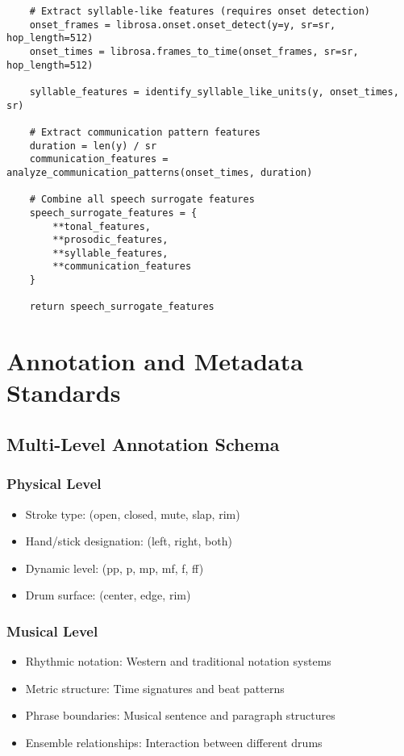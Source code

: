 \documentclass[12pt]{article}
\begin{document}
\begin{verbatim}
    # Extract syllable-like features (requires onset detection)
    onset_frames = librosa.onset.onset_detect(y=y, sr=sr, hop_length=512)
    onset_times = librosa.frames_to_time(onset_frames, sr=sr, hop_length=512)
    
    syllable_features = identify_syllable_like_units(y, onset_times, sr)
    
    # Extract communication pattern features
    duration = len(y) / sr
    communication_features = analyze_communication_patterns(onset_times, duration)
    
    # Combine all speech surrogate features
    speech_surrogate_features = {
        **tonal_features,
        **prosodic_features,
        **syllable_features,
        **communication_features
    }
    
    return speech_surrogate_features
\end{verbatim}

\section{Annotation and Metadata Standards}

\subsection{Multi-Level Annotation Schema}

\subsubsection{Physical Level}
\begin{itemize}
    \item Stroke type: (open, closed, mute, slap, rim)
    \item Hand/stick designation: (left, right, both)
    \item Dynamic level: (pp, p, mp, mf, f, ff)
    \item Drum surface: (center, edge, rim)
\end{itemize}

\subsubsection{Musical Level}
\begin{itemize}
    \item Rhythmic notation: Western and traditional notation systems
    \item Metric structure: Time signatures and beat patterns
    \item Phrase boundaries: Musical sentence and paragraph structures
    \item Ensemble relationships: Interaction between different drums
\end{itemize}
\end{document}
